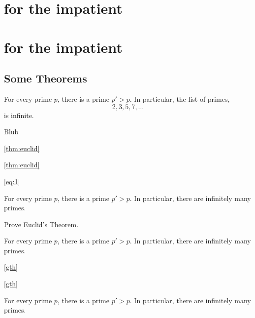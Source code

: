 \ifthmtools
\chapter{ for the impatient}
\else
\chapter{ for the impatient}
\fi

\section{Some Theorems} \label{mysec}

\begin{theorem}[name=Euclid,restate=firsteuclid]
\label{thm:euclid}%
For every prime $p$, there is a prime $p'>p$.
In particular, the list of primes,
\begin{equation}\label{eq:1}
2,3,5,7,\dots
\end{equation}
is infinite.
\end{theorem}

\begin{theorem}
\label{thm:blub}%
Blub
\end{theorem}

\autoref{thm:euclid}

\cref{thm:euclid}


\autoref{eq:1}

\begin{theoremS}[Euclid]
For every prime $p$, there is a prime $p'>p$.
In particular, there are infinitely many primes.
\end{theoremS}

\begin{exercise}
Prove Euclid’s Theorem.
\end{exercise}

\begin{lem}[label=gth]
For every prime $p$, there is a prime $p'>p$.
In particular, there are infinitely many primes.
\end{lem}

\autoref{gth}

\cref{gth}


\begin{euclid}
For every prime $p$, there is a prime $p'>p$.
In particular, there are infinitely many primes.
\end{euclid}

